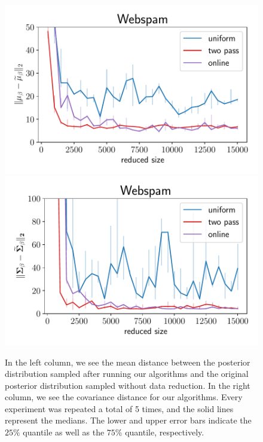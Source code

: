 \begin{figure}[ht!]
    \includegraphics[width=.49\linewidth]{figures/webspam_bayes_plot_norm.pdf}
    \includegraphics[width=.49\linewidth]{figures/webspam_bayes_plot_matrix_norm.pdf}
    \caption{In the left column, we see the mean distance between the posterior
        distribution sampled after running our algorithms and
        the original posterior distribution sampled without data
        reduction. In the right column, we see the covariance distance for
        our algorithms. Every experiment was repeated a total
        of 5 times, and the solid lines represent the
        medians. The lower and upper error bars indicate the
        $25\%$ quantile as well as the $75\%$ quantile, respectively.}
    \label{fig:bayes-plots-norm-cov}
\end{figure}


